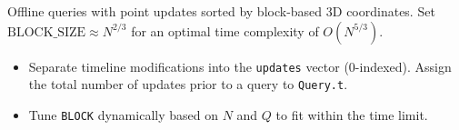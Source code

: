 
Offline queries with point updates sorted by block-based 3D coordinates. Set $\text{BLOCK\_SIZE} \approx N^{2/3}$ for an optimal time complexity of $O(N^{5/3})$.



\begin{itemize}
    \item Separate timeline modifications into the \lstinline|updates| vector ($0$-indexed). Assign the total number of updates prior to a query to \lstinline|Query.t|.
    \item Tune \lstinline|BLOCK| dynamically based on $N$ and $Q$ to fit within the time limit.
\end{itemize}
